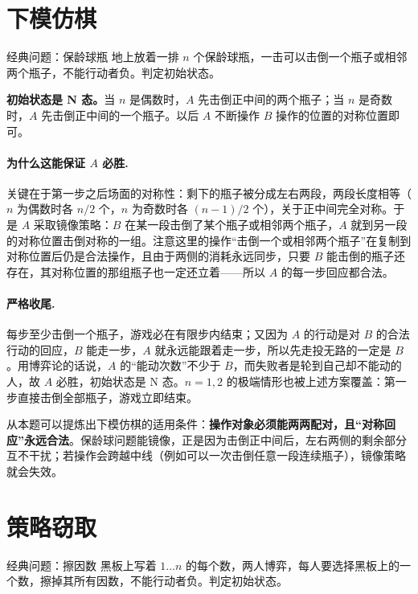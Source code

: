 \section{下模仿棋}
\begin{problem}{经典问题：保龄球瓶}
地上放着一排 $n$ 个保龄球瓶，一击可以击倒一个瓶子或相邻两个瓶子，不能行动者负。判定初始状态。
\end{problem}

\sol \textbf{初始状态是 N 态。}当 $n$ 是偶数时，$A$ 先击倒正中间的两个瓶子；当 $n$ 是奇数时，$A$ 先击倒正中间的一个瓶子。以后 $A$ 不断操作 $B$ 操作的位置的对称位置即可。

\paragraph{为什么这能保证 $A$ 必胜.} 关键在于第一步之后场面的对称性：剩下的瓶子被分成左右两段，两段长度相等（$n$ 为偶数时各 $n/2$ 个，$n$ 为奇数时各 $(n-1)/2$ 个），关于正中间完全对称。于是 $A$ 采取镜像策略：$B$ 在某一段击倒了某个瓶子或相邻两个瓶子，$A$ 就到另一段的对称位置击倒对称的一组。注意这里的操作“击倒一个或相邻两个瓶子”在复制到对称位置后仍是合法操作，且由于两侧的消耗永远同步，只要 $B$ 能击倒的瓶子还存在，其对称位置的那组瓶子也一定还立着——所以 $A$ 的每一步回应都合法。

\paragraph{严格收尾.} 每步至少击倒一个瓶子，游戏必在有限步内结束；又因为 $A$ 的行动是对 $B$ 的合法行动的回应，$B$ 能走一步，$A$ 就永远能跟着走一步，所以先走投无路的一定是 $B$。用博弈论的话说，$A$ 的“能动次数”不少于 $B$，而失败者是轮到自己却不能动的人，故 $A$ 必胜，初始状态是 N 态。$n=1,2$ 的极端情形也被上述方案覆盖：第一步直接击倒全部瓶子，游戏立即结束。

从本题可以提炼出下模仿棋的适用条件：\textbf{操作对象必须能两两配对，且“对称回应”永远合法}。保龄球问题能镜像，正是因为击倒正中间后，左右两侧的剩余部分互不干扰；若操作会跨越中线（例如可以一次击倒任意一段连续瓶子），镜像策略就会失效。

\section{策略窃取}
\begin{problem}{经典问题：擦因数}
黑板上写着 $1\ldots n$ 的每个数，两人博弈，每人要选择黑板上的一个数，擦掉其所有因数，不能行动者负。判定初始状态。
\end{problem}

